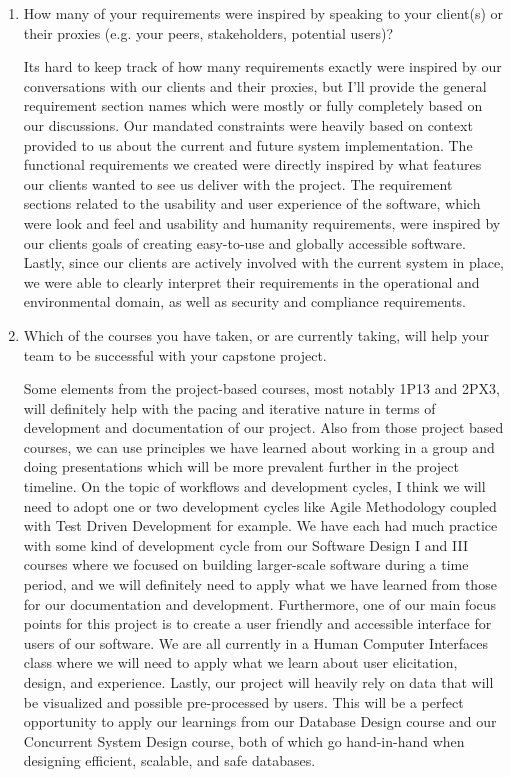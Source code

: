 \begin{enumerate}
  \item How many of your requirements were inspired by speaking to your
  client(s) or their proxies (e.g. your peers, stakeholders, potential users)?
  \par{Its hard to keep track of how many requirements exactly were inspired by our conversations with our clients and their proxies, but I'll provide the 
  general requirement section names which were mostly or fully completely based on our discussions. Our mandated constraints were heavily based on context 
  provided to us about the current and future system implementation. The functional requirements we created were directly inspired by what features our clients wanted 
  to see us deliver with the project. The requirement sections related to the usability and user experience of the software, which were look and feel 
  and usability and humanity requirements, were inspired by our clients goals of creating easy-to-use and globally accessible software. Lastly, since our clients are 
  actively involved with the current system in place, we were able to clearly interpret their requirements in the operational and environmental domain, 
  as well as security and compliance requirements.}

  \item Which of the courses you have taken, or are currently taking, will help
  your team to be successful with your capstone project.
  \par{Some elements from the project-based courses, most notably 1P13 and 2PX3, will definitely help with the pacing and iterative nature in terms of development and 
  documentation of our project. Also from those project based courses, we can use principles we have learned about working in a group and doing presentations which will 
  be more prevalent further in the project timeline. On the topic of workflows and development cycles, I think we will need to adopt one or two development cycles like 
  Agile Methodology coupled with Test Driven Development for example. We have each had much practice with some kind of development cycle from our Software Design I and III 
  courses where we focused on building larger-scale software during a time period, and we will definitely need to apply what we have learned from those for our documentation 
  and development. Furthermore, one of our main focus points for this project is to create a user friendly and accessible interface for users of our software. We are all 
  currently in a Human Computer Interfaces class where we will need to apply what we learn about user elicitation, design, and experience. Lastly, our project will heavily rely 
  on data that will be visualized and possible pre-processed by users. This will be a perfect opportunity to apply our learnings from our Database Design course and our Concurrent 
  System Design course, both of which go hand-in-hand when designing efficient, scalable, and safe databases.}
\end{enumerate}


